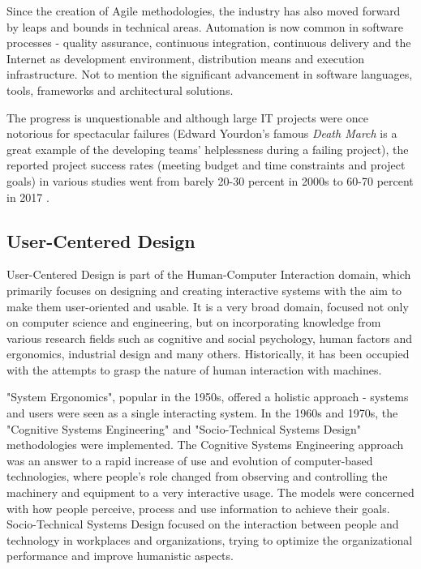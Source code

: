 \documentclass{article}
\begin{document}
Since the creation of Agile methodologies, the industry has also moved forward by leaps and bounds in technical areas. Automation is now common in software processes - quality assurance, continuous integration, continuous delivery and the Internet as development environment, distribution means and execution infrastructure. Not to mention the significant advancement in software languages, tools, frameworks and architectural solutions. \citep{fuggetta2014software}

The progress is unquestionable and although large IT projects were once notorious for spectacular failures (Edward Yourdon's famous \textit{Death March} \citep{yourdon1997death} is a great example of the developing teams' helplessness during a failing project), the reported project success rates (meeting budget and time constraints and project goals) in various studies went from barely 20-30 percent in 2000s \citep{kaur2013software} to 60-70 percent in 2017 \citep{pmi2017pulse}.

\subsection{User-Centered Design}
User-Centered Design is part of the Human-Computer Interaction domain, which primarily focuses on designing and creating interactive systems with the aim to make them user-oriented and usable. It is a very broad domain, focused not only on computer science and engineering, but on incorporating knowledge from various research fields such as cognitive and social psychology, human factors and ergonomics, industrial design and many others. Historically, it has been occupied with the attempts to grasp the nature of human interaction with machines. \citep{ritter2014user}

"System Ergonomics", popular in the 1950s, offered a holistic approach - systems and users were seen as a single interacting system. In the 1960s and 1970s, the "Cognitive Systems Engineering" and "Socio-Technical Systems Design" methodologies were implemented. The Cognitive Systems Engineering approach was an answer to a rapid increase of use and evolution of computer-based technologies, where people's role changed from observing and controlling the machinery and equipment to a very interactive usage. The models were concerned with how people perceive, process and use information to achieve their goals. Socio-Technical Systems Design focused on the interaction between people and technology in workplaces and organizations, trying to optimize the organizational performance and improve humanistic aspects.
\end{document}
